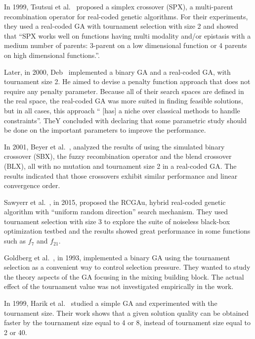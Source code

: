 In 1999, Tsutsui et al.~\cite{tsutsui1999multi} proposed a simplex crossover (SPX), a multi-parent recombination operator for real-coded genetic algorithms. For their experiments, they used a real-coded GA with tournament selection with size 2 and showed that ``SPX works well on functions having multi modality and/or epistasis with a medium number of parents: 3-parent on a low dimensional function or 4 parents on high dimensional functions.''. 

Later, in 2000, Deb~\cite{deb2000efficient} implemented a binary GA and a real-coded GA, with tournament size 2. He aimed to devise a penalty function approach that does not require any penalty parameter. Because all of their search spaces are defined in the real space, the real-coded GA was more suited in finding feasible solutions, but in all cases, this approach `` [has] a niche over classical methods to handle constraints''. TheY concluded with declaring that some parametric study should be done on the important parameters to improve the performance.



In 2001, Beyer et al.~\cite{beyer2001self}, analyzed the results of using the simulated binary crossover (SBX), the fuzzy recombination operator and the blend crossover (BLX), all with no mutation and tournament size 2 in a real-coded GA. The results indicated that those crossovers exhibit similar performance and linear convergence order.


Sawyerr et al.~\cite{sawyerr2015benchmarking}, in 2015, proposed the RCGAu, hybrid real-coded genetic algorithm with ``uniform random direction'' search mechanism. They used tournament selection with size 3 to explore the suite of noiseless black-box optimization testbed and the results showed great performance in some functions such as $f_7$ and $f_{21}$.

Goldberg et al.~\cite{goldberg1993toward}, in 1993, implemented a binary GA using the tournament selection as a convenient way to control selection pressure. They wanted to study the theory aspects of the GA focusing in the mixing building block. The actual effect of the tournament value was not investigated empirically in the work.

In 1999, Harik et al.~\cite{harik1999compact} studied a simple GA and experimented with the tournament size. Their work shows that a given solution quality can be obtained faster by the tournament size equal to 4 or 8, instead of tournament size equal to 2 or 40. 

